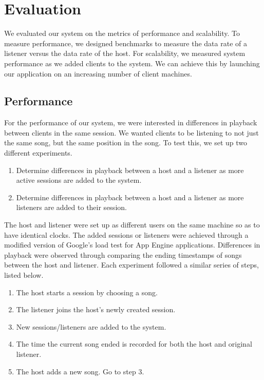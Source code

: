 \section{Evaluation}
\label{sec:eval}
We evaluated our system on the metrics of performance
and scalability. To measure performance, 
we designed benchmarks to measure the data rate 
of a listener versus the data rate of the host.
For scalability, we measured system 
performance as we added clients to the system. We can 
achieve this by launching our application on an 
increasing number of client machines.

\subsection{Performance}

For the performance of our system, we were interested in
differences in playback between clients in the same session.
We wanted clients to be listening to not just the same song,
but the same position in the song. To test this, we set up two
different experiments.

\begin{enumerate}

\item Determine differences in playback between a host and a
listener as more active sessions are added to the system.

\item Determine differences in playback between a host and a
listener as more listeners are added to their session.

\end{enumerate}

The host and listener were set up as different users on the same machine
so as to have identical clocks. The added sessions or listeners
were achieved through a modified version of Google's load test
for App Engine applications. Differences in playback were observed
through comparing the ending timestamps of songs between the host
and listener. Each experiment followed a similar series of steps,
listed below.

\begin{enumerate}

\item The host starts a session by choosing a song.

\item The listener joins the host's newly created session.

\item New sessions/listeners are added to the system.

\item The time the current song ended is recorded for both the
host and original listener.

\item The host adds a new song. Go to step 3.

\end{enumerate}

